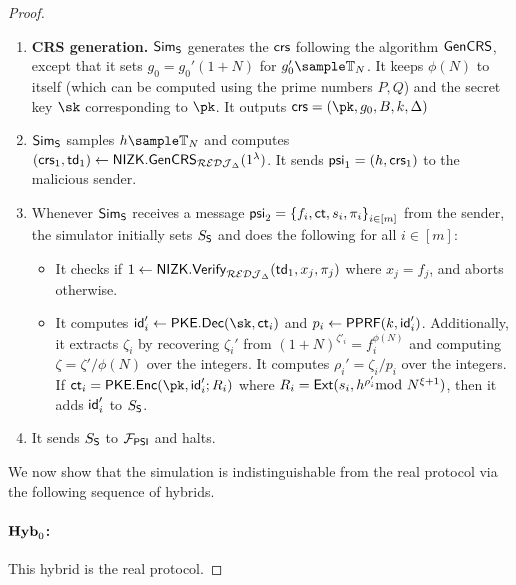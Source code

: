 \begin{proof}
\begin{enumerate}
    \item \textbf{CRS generation.} $\mathsf{Sim}_{\mathsf{S}}$ generates the $\mathsf{crs}$ following the algorithm $\mathsf{GenCRS}$, except that it sets $g_0=g_0'(1+N)$ for $g_0'\sample \TT_N$. It keeps $\phi(N)$ to itself (which can be computed using the prime numbers $P,Q$) and the secret key $\sk$ corresponding to $\pk$. It outputs $\crs=(\pk,g_0,B,k,\Delta)$
    \item $\mathsf{Sim}_{\mathsf{S}}$ samples $h\sample\TT_N$ and computes $\left(\mathsf{crs}_1,\mathsf{td}_1\right)\leftarrow\mathsf{NIZK.GenCRS}_{\mathcal{REDJ}_{\Delta}}(1^\lambda)$. It sends $\mathsf{psi}_1=\left(h,\mathsf{crs}_1\right)$ to the malicious sender.
    \item Whenever $\mathsf{Sim}_{\mathsf{S}}$ receives a message $\mathsf{psi}_2=\left\{f_i,\mathsf{ct},s_i,\pi_i\right\}_{i\in [m]}$ from the sender, the simulator initially sets $S_{\mathsf{S}}$ and does the following for all $i\in [m]$:
    \begin{itemize}
        \item It checks if $1\leftarrow\mathsf{NIZK.Verify}_{\mathcal{REDJ}_{\Delta}}(\mathsf{td}_1,x_j,\pi_j)$ where $x_j=f_j$, and aborts otherwise.
        \item It computes $\id'_i\leftarrow\mathsf{PKE.Dec}(\sk,\ct_i)$ and $p_i\leftarrow\mathsf{PPRF}(k,\mathsf{id}'_i)$. Additionally, it extracts $\zeta_i$ by  recovering $ \zeta_i'$ from $(1+N)^{\zeta'_i}=f_i^{\phi(N)}$ and computing $\zeta=\zeta'/\phi(N)$ over the integers. It computes $\rho_i'=\zeta_i/p_i$ over the integers. If $\ct_i=\mathsf{PKE.Enc}(\pk,\id'_i;R_i)$ where $R_i=\mathsf{Ext}(s_i,h^{\rho_i'}\!\!\!\!\mod N^{\xi+1})$, then it adds $\mathsf{id}'_i$ to $S_{\mathsf{S}}$. 
    \end{itemize}
    \item It sends $S_{\mathsf{S}}$ to $\mathcal{F}_{\mathsf{PSI}}$ and halts.
\end{enumerate}

We now show that the simulation is indistinguishable from the real protocol via the following sequence of hybrids.
\paragraph{$\mathsf{\mathbf{Hyb}}_0$:} This hybrid is the real protocol.


\end{proof}
